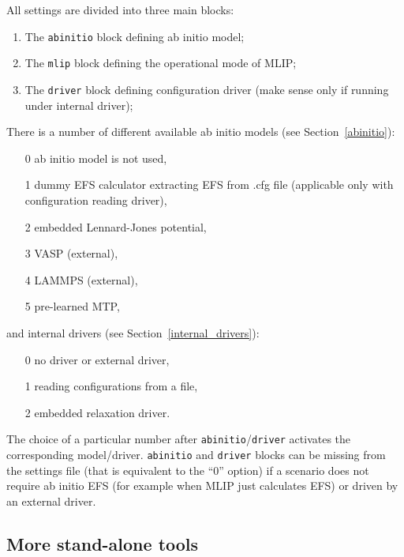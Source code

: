 \documentclass[12pt]{article}
\renewcommand{\_}{\char`_}
\begin{document}
All settings are divided into three main blocks:
\begin{enumerate}
	\item The \texttt{abinitio} block defining ab initio model;
	\item The \texttt{mlip} block defining the operational mode of MLIP;
	\item The \texttt{driver} block defining configuration driver (make sense only if running under internal driver);
\end{enumerate}
There is a number of different available ab initio models (see Section~\ref{abinitio}):
\begin{enumerate}
	\item[0] ab initio model is not used,
	\item[1] dummy EFS calculator extracting EFS from .cfg file (applicable only with configuration reading driver),
	\item[2] embedded Lennard-Jones potential,
	\item[3] VASP (external),
	\item[4] LAMMPS (external),
	\item[5] pre-learned MTP,
\end{enumerate}
and internal drivers (see Section~\ref{internal_drivers}):
\begin{enumerate}
	\item[0] no driver or external driver,
	\item[1] reading configurations from a file,
	\item[2] embedded relaxation driver.
\end{enumerate}
The choice of a particular number after \texttt{abinitio}/\texttt{driver} activates the corresponding model/driver. \texttt{abinitio} and \texttt{driver} blocks can be missing from the settings file (that is equivalent to the ``0'' option) if a scenario does not require ab initio EFS (for example when MLIP just calculates EFS) or driven by an external driver.

\subsection{More stand-alone tools}\label{utils}
\end{document}
